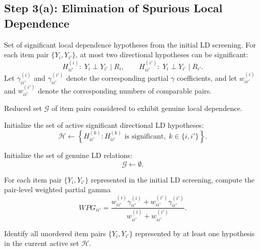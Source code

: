 \subsection*{Step 3(a): Elimination of Spurious Local Dependence}
\begin{breakablealgorithm}
\caption{Elimination of Spurious Local Dependence}
\label{alg:LD_eli_algo}

\begin{algorithmic}[1]
\Require Set of significant local dependence hypotheses from the initial LD screening.
For each item pair $\{Y_i,Y_{i'}\}$, at most two directional hypotheses can be significant:
\[
H_{ii'}^{(i)}:\; Y_i \perp Y_{i'} \mid R_i,
\qquad
H_{ii'}^{(i')}:\; Y_i \perp Y_{i'} \mid R_{i'}.
\]
Let $\gamma_{ii'}^{(i)}$ and $\gamma_{ii'}^{(i')}$ denote the corresponding partial
$\gamma$ coefficients, and let $w_{ii'}^{(i)}$ and $w_{ii'}^{(i')}$ denote the
corresponding numbers of comparable pairs.

\Ensure Reduced set $\mathcal{G}$ of item pairs considered to exhibit genuine local dependence.

\State Initialize the set of active significant directional LD hypotheses:
\[
\mathcal{H}
\gets
\left\{
H_{ii'}^{(k)}
:
H_{ii'}^{(k)} \text{ is significant},
\;
k \in \{i,i'\}
\right\}.
\]

\State Initialize the set of genuine LD relations:
\[
\mathcal{G} \gets \emptyset.
\]

\State For each item pair $\{Y_i,Y_{i'}\}$ represented in the initial LD
screening, compute the pair-level weighted partial gamma
%
\[
WPG_{ii'}
=
\frac{
w_{ii'}^{(i)}\gamma_{ii'}^{(i)}
+
w_{ii'}^{(i')}\gamma_{ii'}^{(i')}
}{
w_{ii'}^{(i)} + w_{ii'}^{(i')}
}.
\]


    \State Identify all unordered item pairs $\{Y_i,Y_{i'}\}$ represented by at least one
    hypothesis in the current active set $\mathcal{H}$.


\end{algorithmic}
\end{breakablealgorithm}
